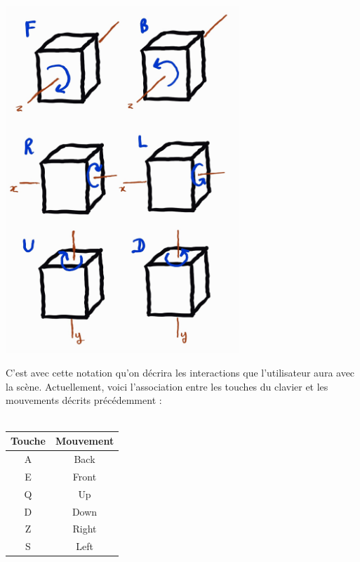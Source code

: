 \begin{center}
\includegraphics[width=250pt]{Rubik2.jpg}
\end{center}
C'est avec cette notation qu'on décrira les interactions que l'utilisateur aura avec la scène. Actuellement, voici l'association entre les touches du clavier et les mouvements décrits précédemment :
\\\\
\begin{tabular}{| c | c |}
	\hline
	Touche & Mouvement \\
	\hline \hline
	A & Back \\ \hline
	E & Front \\ \hline
	Q & Up \\ \hline
	D & Down \\ \hline
	Z & Right \\ \hline
	S & Left \\ \hline
\end{tabular}